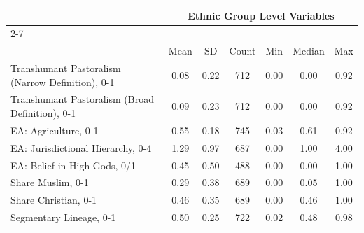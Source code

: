 {
\def\sym#1{\ifmmode^{#1}\else\(^{#1}\)\fi}
\begin{tabular}{l*{1}{cccccc}}
\toprule
     &\multicolumn{6}{c}{Ethnic Group Level Variables}                             \\\cmidrule(lr){2-7}
     &\multicolumn{6}{c}{}                                                         \\
     &        Mean&          SD&       Count&         Min&      Median&         Max\\
\midrule
Transhumant Pastoralism (Narrow Definition), 0-1&        0.08&        0.22&         712&        0.00&        0.00&        0.92\\
Transhumant Pastoralism (Broad Definition), 0-1&        0.09&        0.23&         712&        0.00&        0.00&        0.92\\
EA: Agriculture, 0-1&        0.55&        0.18&         745&        0.03&        0.61&        0.92\\
EA: Jurisdictional Hierarchy, 0-4&        1.29&        0.97&         687&        0.00&        1.00&        4.00\\
EA: Belief in High Gods, 0/1&        0.45&        0.50&         488&        0.00&        0.00&        1.00\\
Share Muslim, 0-1&        0.29&        0.38&         689&        0.00&        0.05&        1.00\\
Share Christian, 0-1&        0.46&        0.35&         689&        0.00&        0.46&        1.00\\
Segmentary Lineage, 0-1&        0.50&        0.25&         722&        0.02&        0.48&        0.98\\
\bottomrule
\end{tabular}
}
